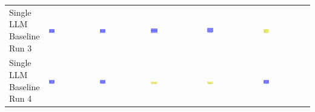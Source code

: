 \begin{table}
\begin{tabularx}{\textwidth}{@{}XXXXXX@{}}
    \makecell{Single LLM \\ Baseline \\ Run 3} & \includegraphics[width=0.13\textwidth]{./run_3/png/gpt-4o_results/MicrofluidicChip.png} & \includegraphics[width=0.13\textwidth]{./run_3/png/o1-preview_results/MicrofluidicChip.png} & \includegraphics[width=0.13\textwidth]{./run_3/png/claude-3-5-sonnet-20240620_results/MicrofluidicChip.png} & \includegraphics[width=0.13\textwidth]{./run_3/png/watsonx_meta-llama_llama-3-1-70b-instruct_results/MicrofluidicChip.png} & \includegraphics[width=0.13\textwidth]{./run_3/png/watsonx_meta-llama_llama-3-405b-instruct_results/MicrofluidicChip.png} \\
    \makecell{Single LLM \\ Baseline \\ Run 4} & \includegraphics[width=0.13\textwidth]{./run_4/png/gpt-4o_results/MicrofluidicChip.png} & \includegraphics[width=0.13\textwidth]{./run_4/png/o1-preview_results/MicrofluidicChip.png} & \includegraphics[width=0.13\textwidth]{./run_4/png/claude-3-5-sonnet-20240620_results/MicrofluidicChip.png} & \includegraphics[width=0.13\textwidth]{./run_4/png/watsonx_meta-llama_llama-3-1-70b-instruct_results/MicrofluidicChip.png} & \includegraphics[width=0.13\textwidth]{./run_4/png/watsonx_meta-llama_llama-3-405b-instruct_results/MicrofluidicChip.png} \\

\end{tabularx}
\end{table}
